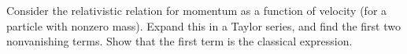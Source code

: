 Consider the relativistic relation for momentum as a function of velocity
(for a particle with nonzero mass).
Expand this in a Taylor series, and find the
first two nonvanishing terms. Show that the first term is the classical
expression.

